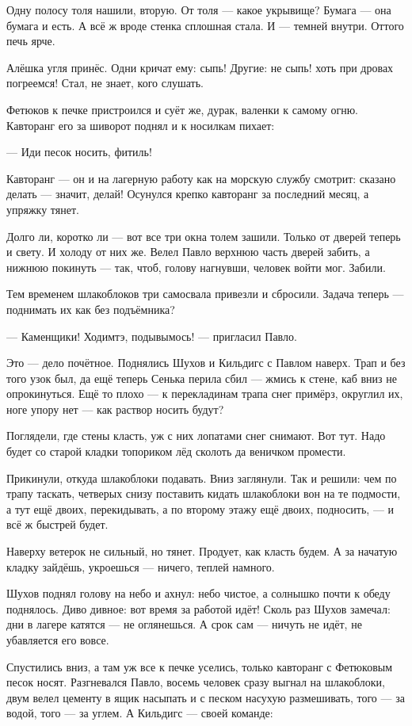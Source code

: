 Одну полосу толя нашили, вторую. От толя --- какое укрывище? Бумага --- она бумага и есть. А всё ж вроде стенка сплошная стала. И --- темней внутри. Оттого печь ярче.

Алёшка угля принёс. Одни кричат ему: сыпь! Другие: не сыпь! хоть при дровах погреемся! Стал, не знает, кого слушать.

Фетюков к печке пристроился и суёт же, дурак, валенки к самому огню. Кавторанг его за шиворот поднял и к носилкам пихает:

--- Иди песок носить, фитиль!

Кавторанг --- он и на лагерную работу как на морскую службу смотрит: сказано делать --- значит, делай! Осунулся крепко кавторанг за последний месяц, а упряжку тянет.

Долго ли, коротко ли --- вот все три окна толем зашили. Только от дверей теперь и свету. И холоду от них же. Велел Павло верхнюю часть дверей забить, а нижнюю покинуть --- так, чтоб, голову нагнувши, человек войти мог. Забили.

Тем временем шлакоблоков три самосвала привезли и сбросили. Задача теперь --- поднимать их как без подъёмника?

--- Каменщики! Ходимтэ, подывымось! --- пригласил Павло.

Это --- дело почётное. Поднялись Шухов и Кильдигс с Павлом наверх. Трап и без того узок был, да ещё теперь Сенька перила сбил --- жмись к стене, каб вниз не опрокинуться. Ещё то плохо --- к перекладинам трапа снег примёрз, округлил их, ноге упору нет --- как раствор носить будут?

Поглядели, где стены класть, уж с них лопатами снег снимают. Вот тут. Надо будет со старой кладки топориком лёд сколоть да веничком промести.

Прикинули, откуда шлакоблоки подавать. Вниз заглянули. Так и решили: чем по трапу таскать, четверых снизу поставить кидать шлакоблоки вон на те подмости, а тут ещё двоих, перекидывать, а по второму этажу ещё двоих, подносить, --- и всё ж быстрей будет.

Наверху ветерок не сильный, но тянет. Продует, как класть будем. А за начатую кладку зайдёшь, укроешься --- ничего, теплей намного.

Шухов поднял голову на небо и ахнул: небо чистое, а солнышко почти к обеду поднялось. Диво дивное: вот время за работой идёт! Сколь раз Шухов замечал: дни в лагере катятся --- не оглянешься. А срок сам --- ничуть не идёт, не убавляется его вовсе.

Спустились вниз, а там уж все к печке уселись, только кавторанг с Фетюковым песок носят. Разгневался Павло, восемь человек сразу выгнал на шлакоблоки, двум велел цементу в ящик насыпать и с песком насухую размешивать, того --- за водой, того --- за углем. А Кильдигс --- своей команде:

